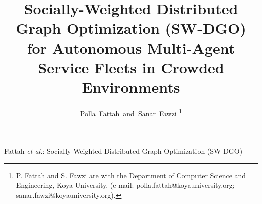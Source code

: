 \documentclass[journal]{IEEEtran}
\newif\ifanonymous
\begin{document}
\title{Socially-Weighted Distributed Graph Optimization (SW-DGO) for Autonomous Multi-Agent Service Fleets in Crowded Environments}

\ifanonymous
  \author{Anonymous Author(s)%
  \thanks{Author names and affiliations are withheld for double-blind review.}}
  \markboth{Socially-Weighted Distributed Graph Optimization (SW-DGO)}%
  {Socially-Weighted Distributed Graph Optimization (SW-DGO)}
\else
  \author{Polla~Fattah~and~Sanar~Fawzi%
  \thanks{P. Fattah and S. Fawzi are with the Department of Computer Science and Engineering, Koya University. (e-mail: polla.fattah@koyauniversity.org; sanar.fawzi@koyauniversity.org).}}
  {Fattah \MakeLowercase{\textit{et al.}}: Socially-Weighted Distributed Graph Optimization (SW-DGO)}
\fi

\maketitle
\end{document}
